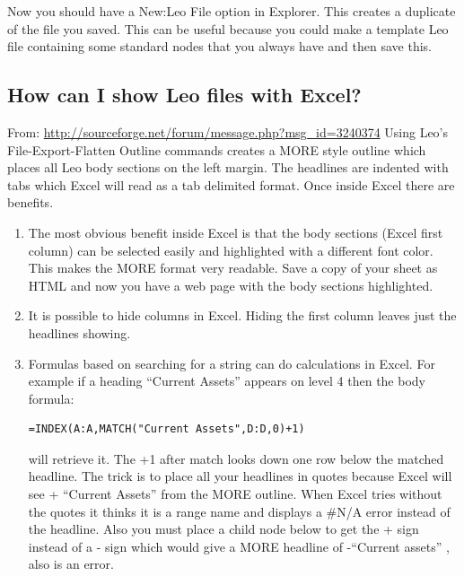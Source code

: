\documentclass[a4paper,10pt,english]{sphinxmanual}
\begin{document}
Now you should have a New:Leo File option in Explorer. This creates a duplicate
of the file you saved. This can be useful because you could make a template Leo
file containing some standard nodes that you always have and then save this.


\subsection{How can I show Leo files with Excel?}
\label{FAQ:how-can-i-show-leo-files-with-excel}
From: \href{http://sourceforge.net/forum/message.php?msg\_id=3240374}{http://sourceforge.net/forum/message.php?msg\_id=3240374}
Using Leo's File-Export-Flatten Outline commands creates a MORE style outline which places
all Leo body sections on the left margin.
The headlines are indented with tabs which Excel will read as a tab delimited format.
Once inside Excel there are benefits.
\begin{enumerate}
\item {} 
The most obvious benefit inside Excel is that the body sections (Excel first
column) can be selected easily and highlighted with a different font color.
This makes the MORE format very readable. Save a copy of your sheet as HTML
and now you have a web page with the body sections highlighted.

\item {} 
It is possible to hide columns in Excel.
Hiding the first column leaves just the headlines showing.

\item {} 
Formulas based on searching for a string can do calculations in Excel.
For example if a heading ``Current Assets'' appears on level 4 then the body formula:

\begin{Verbatim}[commandchars=\\\{\}]
=INDEX(A:A,MATCH("Current Assets",D:D,0)+1)
\end{Verbatim}

will retrieve it. The +1 after match looks down one row below the matched
headline. The trick is to place all your headlines in quotes because Excel
will see + ``Current Assets'' from the MORE outline. When Excel tries
without the quotes it thinks it is a range name and displays a \#N/A
error instead of the headline. Also you must place a child node below to
get the + sign instead of a - sign which would give a MORE headline of
-``Current assets'' , also is an error.

\end{enumerate}
\end{document}
